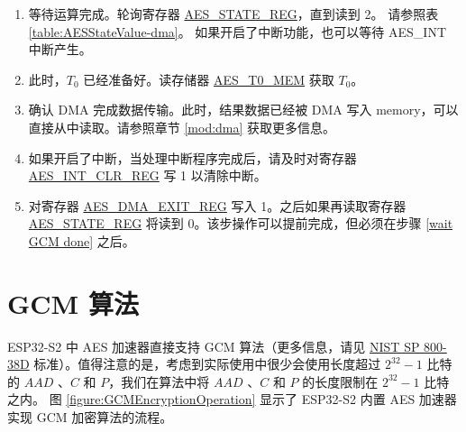 \documentclass[main\_\_CN.tex]{subfiles}
\begin{document}
\begin{enumerate}
    \item \label{wait GCM done}
            等待运算完成。轮询寄存器 \hyperref[regdesc:AESSTATEREG]{AES\_STATE\_REG}，直到读到 2。 请参照表  \ref{table:AESStateValue-dma}。
            如果开启了中断功能，也可以等待 AES\_INT 中断产生。
    \item 此时，$T_0$ 已经准备好。读存储器 \hyperref[memdesc:AEST0MEM]{AES\_T0\_MEM} 获取 $T_0$。
    \item 确认 DMA 完成数据传输。此时，结果数据已经被 DMA 写入 memory，可以直接从中读取。请参照章节 \ref{mod:dma} \textit{}获取更多信息。
    \item 如果开启了中断，当处理中断程序完成后，请及时对寄存器 \hyperref[regdesc:AESINTCLRREG]{AES\_INT\_CLR\_REG} 写 1 以清除中断。
    \item 对寄存器 \hyperref[regdesc:AESDMAEXITREG]{AES\_DMA\_EXIT\_REG} 写入 1。之后如果再读取寄存器 \hyperref[regdesc:AESSTATEREG]{AES\_STATE\_REG} 将读到 0。该步操作可以提前完成，但必须在步骤 \ref{wait GCM done} 之后。
\end{enumerate}


\section{GCM 算法}\label{Label GCM algorithm}

ESP32-S2 中 AES 加速器直接支持 GCM 算法（更多信息，请见 \href{https://nvlpubs.nist.gov/nistpubs/Legacy/SP/nistspecialpublication800-38d.pdf}{NIST SP 800-38D} 标准）。值得注意的是，考虑到实际使用中很少会使用长度超过 \begin{math}2^{32}-1\end{math} 比特的 \begin{math}AAD\end{math} 、\begin{math}C\end{math} 和 \begin{math}P\end{math}，我们在算法中将 \begin{math}AAD\end{math} 、\begin{math}C\end{math} 和 \begin{math}P\end{math} 的长度限制在 \begin{math}2^{32}-1\end{math} 比特之内。
图 \ref{figure:GCMEncryptionOperation} 显示了 ESP32-S2 内置 AES 加速器实现 GCM 加密算法的流程。
\end{document}

